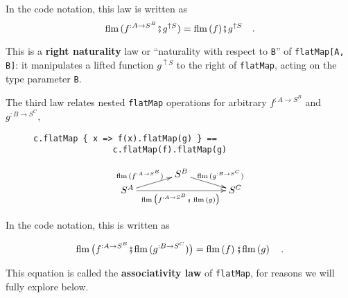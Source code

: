 \noindent In the code notation, this law is written as
\begin{equation}
\text{flm}\,(f^{:A\rightarrow S^{B}}\bef g^{\uparrow S})=\text{flm}\,(f)\bef g^{\uparrow S}\quad.\label{eq:right-naturality-law-flatMap}
\end{equation}

\noindent This is a \textbf{right
naturality} law or \textsf{``}naturality with respect to \lstinline!B!\textsf{''}
of \lstinline!flatMap[A, B]!: it manipulates a lifted function $g^{\uparrow S}$
to the right of \lstinline!flatMap!, acting on the type parameter
\lstinline!B!.

The third law relates nested \lstinline!flatMap! operations for arbitrary
$f^{:A\rightarrow S^{B}}$ and $g^{:B\rightarrow S^{C}}$,

\begin{wrapfigure}{l}{0.4\columnwidth}%
\vspace{-0.75\baselineskip}

\begin{lstlisting}
c.flatMap { x => f(x).flatMap(g) } ==
                c.flatMap(f).flatMap(g)
\end{lstlisting}
\vspace{0.2\baselineskip}
\[
\xymatrix{\xyScaleY{0.2pc}\xyScaleX{3pc} & S^{B}\ar[rd]\sp(0.5){~\ \text{flm}\,(g^{:B\rightarrow S^{C}})}\\
S^{A}\ar[ru]\sp(0.5){\text{flm}\,(f^{:A\rightarrow S^{B}})~~\ }\ar[rr]\sb(0.5){\text{flm}\,\big(f^{:A\rightarrow S^{B}}\bef\,\text{flm}\,(g)\big)\,} &  & S^{C}
}
\]

\vspace{-0.9\baselineskip}
\end{wrapfigure}%

\noindent In the code notation, this is written as

\vspace{-0.6\baselineskip}

\begin{equation}
\text{flm}\,\big(f^{:A\rightarrow S^{B}}\bef\text{flm}\,(g^{:B\rightarrow S^{C}})\big)=\text{flm}\left(f\right)\bef\text{flm}\left(g\right)\quad.\label{eq:associativity-law-flatMap}
\end{equation}
\vspace{-0.6\baselineskip}

\noindent This equation is called the \textbf{associativity law}
of \lstinline!flatMap!, for reasons we will fully explore below.

